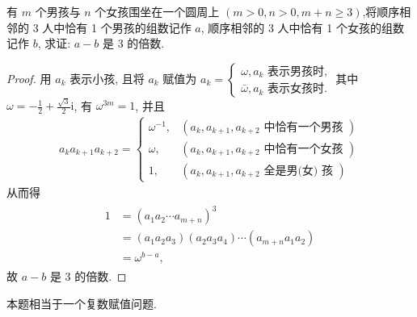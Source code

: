 \begin{exercise}
	有 $m$ 个男孩与 $n$ 个女孩围坐在一个圆周上 $(m>0, n>0, m+n \geqslant 3)$,将顺序相邻的 3 人中恰有 1 个男孩的组数记作 $a$, 顺序相邻的 3 人中恰有 1 个女孩的组数记作 $b$, 求证: $a-b$ 是 3 的倍数.
\end{exercise}
\begin{proof}
	用 $a_k$ 表示小孩, 且将 $a_k$ 赋值为 $a_k=\left\{\begin{array}{l}\omega, a_k \text { 表示男孩时, } \\ \bar{\omega}, a_k \text { 表示女孩时. }\end{array}\right.$其中 $\omega=-\frac{1}{2}+\frac{\sqrt{3}}{2} \mathrm{i}$, 有 $\omega^{3 m}=1$, 并且
	\begin{align*}
		a_k a_{k+1} a_{k+2}= \begin{cases}\omega^{-1}, & \left(a_k, a_{k+1}, a_{k+2} \text { 中恰有一个男孩 }\right) \\ \omega, & \left(a_k, a_{k+1}, a_{k+2} \text { 中恰有一个女孩 }\right) \\ 1, & \left(a_k, a_{k+1}, a_{k+2} \text { 全是男(女) 孩 }\right)\end{cases}
	\end{align*}
	从而得
	\begin{align*}
		\begin{aligned}
			1 & =\left(a_1 a_2 \cdots a_{m+n}\right)^3                                               \\
			  & =\left(a_1 a_2 a_3\right)\left(a_2 a_3 a_4\right) \cdots\left(a_{m+n} a_1 a_2\right) \\
			  & =\omega^{b-a},
		\end{aligned}
	\end{align*}
	故 $a-b$ 是 3 的倍数.
\end{proof}
\begin{note}
	本题相当于一个复数赋值问题.
\end{note}


